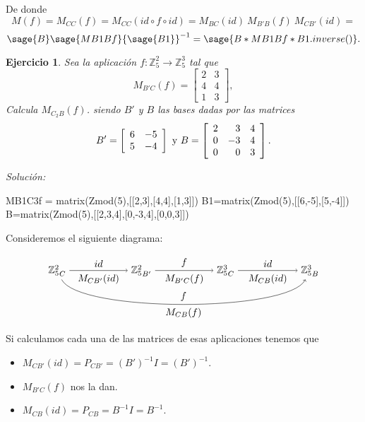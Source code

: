 \documentclass{amsart}
\newtheorem{ejer}{Ejercicio}
\def\z{\mathbb{Z}}
\begin{document}
De donde 
\[ M(f) = M_{CC}(f) = M_{CC}(id\circ f\circ id) =  M_{BC}(id) \ 
M_{B'B}(f) \ M_{CB'}(id) = \] 
\[ \sage{B}\sage{MB1Bf}{\sage{B1}}^{-1} = \sage{B*MB1Bf*B1.inverse()}. \]



\begin{ejer} 
Sea la aplicación $f: \z _5^2\to \z _5^3$ tal que 
\[ M_{B'C}(f) = \left[ \begin{array}{rr} 2 & 3 \\ 4 & 4\\ 
1 & 3 \end{array} \right], \]  Calcula $M_{C_2B}(f)$. siendo $B'$ y $B$ las bases 
dadas por las matrices 
\[ B' = \left[ \begin{array}{rr} 6 & -5\\ 5 & -4 \end{array} \right] 
\ \hbox{y} \ B = \left[ \begin{array}{rrr} 2 & 3 & 4\\ 0 & -3 & 4\\ 
0 & 0 & 3 \end{array} \right].  \]
\end{ejer}

{\it Soluci\'on:}
\begin{sageblock}
MB1C3f = matrix(Zmod(5),[[2,3],[4,4],[1,3]])
B1=matrix(Zmod(5),[[6,-5],[5,-4]])
B=matrix(Zmod(5),[[2,3,4],[0,-3,4],[0,0,3]])
\end{sageblock}

Consideremos el siguiente diagrama:

$$
\begin{tikzpicture}[xscale = 1.5]
\node (ZCa) at (0,0) {${\z _5^2}_C$};
\node (ZBp) at (2,0) {${\z _5^2}_{B'}$};
\node (ZCb) at (4,0) {${\z _5^3}_C$};
\node (ZB)  at (6,0) {${\z _5^3}_B$};
\draw[->] (ZCa) to node [above] {$id$} 
                   node [below] {$M_{CB'}(id)$} (ZBp);
\draw[->] (ZBp) to node [above] {$f$} 
                   node [below] {$M_{B'C}(f)$} (ZCb); 
\draw[->] (ZCb)  to node [above] {$id$} 
                   node [below] {$M_{CB}(id)$} (ZB);
\draw[->] (ZCa) .. controls (0.5,-1.5) and (5.5,-1.5) .. 
                node [below] {$M_{CB}(f)$} 
                node [above] {$f$} (ZB);
\end{tikzpicture}
$$

Si calculamos cada una de las matrices de esas aplicaciones tenemos que
\begin{itemize}
\item $M_{CB'}(id) = P_{CB'} = (B')^{-1}I = (B')^{-1}$.
\item $M_{B'C}(f)$ nos la dan.
\item $M_{CB}(id) = P_{CB} = B^{-1}I= B^{-1}$. 
\end{itemize}
\end{document}
